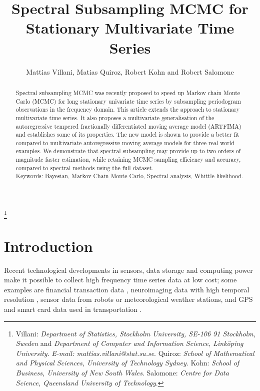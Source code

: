 \documentclass[11pt,english,oneside]{amsart}
\numberwithin{equation}{section}
\theoremstyle{plain}
\numberwithin{equation}{section}
\begin{document}
\title[Multivariate Spectral Subsampling MCMC]{Spectral Subsampling MCMC for Stationary Multivariate Time Series}
\author{Mattias Villani, Matias Quiroz, Robert Kohn and Robert Salomone}
\thanks{
Villani: \textit{Department of Statistics, Stockholm University, SE-106 91 Stockholm, Sweden} and 
\textit{Department of Computer and Information Science, Link{\"o}ping University}.
\textit{E-mail: mattias.villani@stat.su.se}.
Quiroz: \textit{School of Mathematical and Physical Sciences, University of Technology Sydney}.
Kohn: \textit{School of Business, University of New South Wales}.
Salomone:  \textit{Centre for Data Science, Queensland University of Technology}.
}

\begin{abstract}
Spectral subsampling MCMC was recently proposed to speed up Markov chain Monte Carlo (MCMC) for long stationary univariate time series by subsampling periodogram observations in the frequency domain. This article extends the approach to stationary multivariate time series. It also proposes a multivariate generalisation of the autoregressive tempered fractionally differentiated moving average model (ARTFIMA) and establishes some of its properties. The new model is shown to provide a better fit compared to multivariate autoregressive moving average models for three real world examples. We demonstrate that spectral subsampling may provide up to two orders of magnitude faster estimation, while retaining MCMC sampling efficiency and accuracy, compared to spectral methods using the full dataset. \\
                    Keywords: Bayesian, Markov Chain Monte Carlo, Spectral analysis, Whittle likelihood.
\end{abstract}

\maketitle

\section{Introduction}
Recent technological developments in sensors, data storage and computing power make it possible to collect high frequency time series data at low cost; some examples are financial transaction data \citep{mykland2012econometrics}, neuroimaging data with high temporal resolution \citep{chen2019analysis}, sensor data from robots \citep{deisenroth2013gaussian} or meteorological weather stations, and GPS and smart card data used in transportation \citep{welch2019big}.
\end{document}
